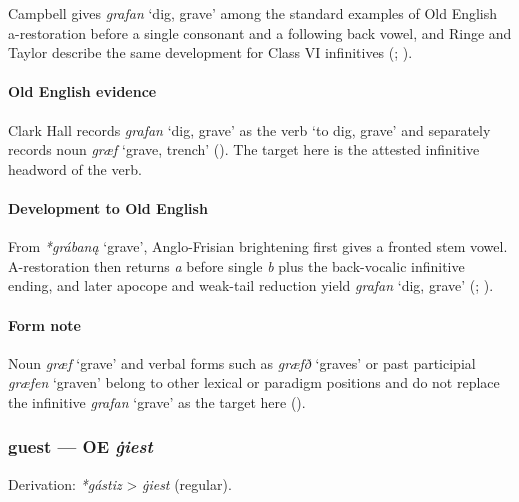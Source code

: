 \documentclass[
  british,
  a4paper,
]{article}
\providecommand{\Recon}[1]{\emph{*#1}}
\begin{document}
Campbell gives {\emph{grafan}} `dig, grave' among the standard examples
of Old English a-restoration before a single consonant and a following
back vowel, and Ringe and Taylor describe the same development for Class
VI infinitives (;
).

\paragraph{Old English evidence}\label{old-english-evidence-30}

Clark Hall records {\emph{grafan}} `dig, grave' as the verb `to dig,
grave' and separately records noun \emph{græf} `grave, trench'
(). The target here is the
attested infinitive headword of the verb.

\paragraph{Development to Old
English}\label{development-to-old-english-30}

From \Recon{grábaną} `grave', Anglo-Frisian brightening first gives a
fronted stem vowel. A-restoration then returns \emph{a} before single
\emph{b} plus the back-vocalic infinitive ending, and later apocope and
weak-tail reduction yield {\emph{grafan}} `dig, grave'
(;
).

\paragraph{Form note}\label{form-note-4}

Noun \emph{græf} `grave' and verbal forms such as \emph{græfð} `graves'
or past participial \emph{græfen} `graven' belong to other lexical or
paradigm positions and do not replace the infinitive \emph{grafan}
`grave' as the target here ().

\subsubsection{\texorpdfstring{guest --- OE
\emph{ġiest}}{guest --- OE ġiest}}\label{guest-oe-ux121iest}

Derivation: \emph{*gástiz} \textgreater{} \emph{ġiest} (regular).
\end{document}
